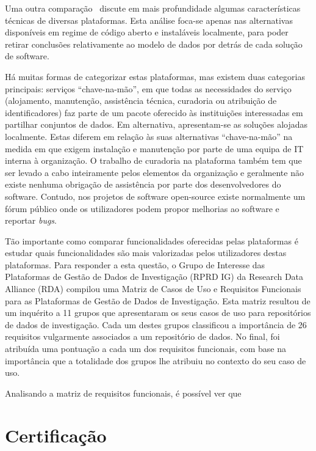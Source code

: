 \documentclass[sigconf,nonacm]{acmart}
\begin{document}
Uma outra comparação~\cite{amorimComparison2017} discute em mais profundidade algumas características técnicas de diversas plataformas. Esta análise foca-se apenas nas alternativas disponíveis em regime de código aberto e instaláveis localmente, para poder retirar conclusões relativamente ao modelo de dados por detrás de cada solução de software. 

Há muitas formas de categorizar estas plataformas, mas existem duas categorias principais: serviços ``chave-na-mão'', em que todas as necessidades do serviço (alojamento, manutenção, assistência técnica, curadoria ou atribuição de identificadores) faz parte de um pacote oferecido às instituições interessadas em partilhar conjuntos de dados. Em alternativa, apresentam-se as soluções alojadas localmente. Estas diferem em relação às suas alternativas ``chave-na-mão'' na medida em que exigem instalação e manutenção por parte de uma equipa de IT interna à organização. O trabalho de curadoria na plataforma também tem que ser levado a cabo inteiramente pelos elementos da organização e geralmente não existe nenhuma obrigação de assistência por parte dos desenvolvedores do software. Contudo, nos projetos de software open-source existe normalmente um fórum público onde os utilizadores podem propor melhorias ao software e reportar \textit{bugs}.


Tão importante como comparar funcionalidades oferecidas pelas plataformas é estudar quais funcionalidades são mais valorizadas pelos utilizadores destas plataformas. Para responder a esta questão, o Grupo de Interesse das Plataformas de Gestão de Dados de Investigação (RPRD IG) da Research Data Alliance (RDA) compilou uma Matriz de Casos de Uso e Requisitos Funcionais para as Plataformas de Gestão de Dados de Investigação. Esta matriz resultou de um inquérito a 11 grupos que apresentaram os seus casos de uso para repositórios de dados de investigação. Cada um destes grupos classificou a importância de 26 requisitos vulgarmente associados a um repositório de dados. No final, foi atribuída uma pontuação a cada um dos requisitos funcionais, com base na importância que a totalidade dos grupos lhe atribuiu no contexto do seu caso de uso.

Analisando a matriz de requisitos funcionais, é possível ver que %

\section{Certificação}
\end{document}
